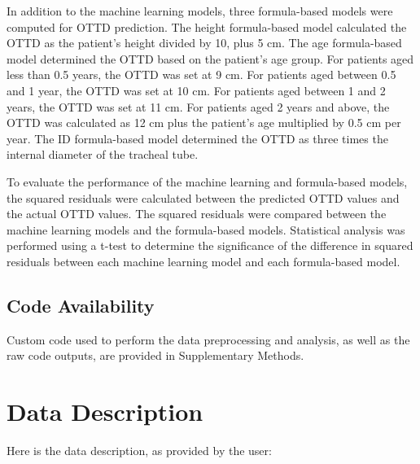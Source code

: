 \documentclass[11pt]{article}
\begin{document}
In addition to the machine learning models, three formula-based models were computed for OTTD prediction. The height formula-based model calculated the OTTD as the patient's height divided by 10, plus 5 cm. The age formula-based model determined the OTTD based on the patient's age group. For patients aged less than 0.5 years, the OTTD was set at 9 cm. For patients aged between 0.5 and 1 year, the OTTD was set at 10 cm. For patients aged between 1 and 2 years, the OTTD was set at 11 cm. For patients aged 2 years and above, the OTTD was calculated as 12 cm plus the patient's age multiplied by 0.5 cm per year. The ID formula-based model determined the OTTD as three times the internal diameter of the tracheal tube.

To evaluate the performance of the machine learning and formula-based models, the squared residuals were calculated between the predicted OTTD values and the actual OTTD values. The squared residuals were compared between the machine learning models and the formula-based models. Statistical analysis was performed using a t-test to determine the significance of the difference in squared residuals between each machine learning model and each formula-based model.\subsection*{Code Availability}

Custom code used to perform the data preprocessing and analysis, as well as the raw code outputs, are provided in Supplementary Methods.


\clearpage
\appendix

\section{Data Description} \label{sec:data_description} Here is the data description, as provided by the user:
\end{document}
